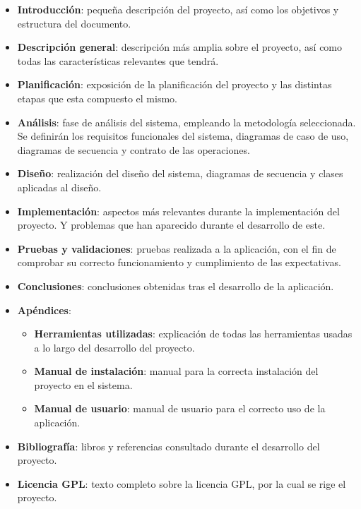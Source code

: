 \begin{itemize}
\item \textbf{Introducción}: pequeña descripción del proyecto, así como los objetivos y estructura del documento.

\item \textbf{Descripción general}: descripción más amplia sobre el proyecto, así como todas las características relevantes
que tendrá.

\item \textbf{Planificación}: exposición de la planificación del proyecto y las distintas etapas que esta compuesto el mismo.

\item \textbf{Análisis}: fase de análisis del sistema, empleando la metodología seleccionada. Se definirán los
requisitos funcionales del sistema, diagramas de caso de uso, diagramas de secuencia y contrato de las operaciones.

\item \textbf{Diseño}: realización del diseño del sistema, diagramas de secuencia y clases aplicadas al diseño.

\item \textbf{Implementación}: aspectos más relevantes durante la implementación del proyecto. Y problemas que han aparecido 
durante el desarrollo de este.

\item \textbf{Pruebas y validaciones}: pruebas realizada a la aplicación, con el fin de comprobar su correcto funcionamiento y
cumplimiento de las expectativas.

\item \textbf{Conclusiones}: conclusiones obtenidas tras el desarrollo de la aplicación.

\item \textbf{Apéndices}: 
\begin{itemize}
\item \textbf{Herramientas utilizadas}: explicación de todas las herramientas usadas a lo largo del desarrollo del 
proyecto.
\item \textbf{Manual de instalación}: manual para la correcta instalación del proyecto en el sistema.
\item \textbf{Manual de usuario}: manual de usuario para el correcto uso de la aplicación.
\end{itemize}

\item \textbf{Bibliografía}: libros y referencias consultado durante el desarrollo del proyecto.

\item \textbf{Licencia GPL}: texto completo sobre la licencia GPL, por la cual se rige el proyecto.

\end{itemize}
